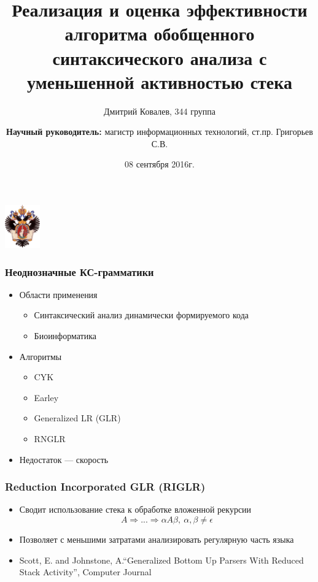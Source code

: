 \documentclass{beamer}
\title[]{Реализация и оценка эффективности алгоритма
	обобщенного синтаксического анализа с уменьшенной
	активностью стека}
\subtitle[]{}
\institute[СПбГУ]{
Санкт-Петербургский государственный университет \\
Кафедра системного программирования }
\author[Дмитрий Ковалев]{Дмитрий Ковалев, 344 группа \\
  \and  
    {\bfseries Научный руководитель:} магистр информационных технологий, ст.пр. Григорьев С.В. \\ 
}
\date{08 сентября 2016г.}
\begin{document}
{
\begin{frame}
  \begin{center}
  {\includegraphics[width=1.5cm]{pictures/SPbGU_Logo.png}}
  \end{center}
  \titlepage
\end{frame}
}

\begin{frame}[fragile]
  \transwipe[direction=90]
  \frametitle{Неоднозначные КС-грамматики}
  \begin{itemize}
    \item Области применения
	\begin{itemize}
		\item Синтаксический анализ динамически формируемого кода
		\item Биоинформатика
	\end{itemize}
	\item Алгоритмы
	\begin{itemize}
		\item CYK
		\item Earley
		\item Generalized LR (GLR)
		\item RNGLR
	\end{itemize}
    \item Недостаток --- скорость
  \end{itemize}
\end{frame}
            
\begin{frame}
  \transwipe[direction=90]
  \frametitle{Reduction Incorporated GLR (RIGLR)}
  \begin{itemize}
    \item Сводит использование стека к обработке вложенной рекурсии
    $$ A \Rightarrow ... \Rightarrow \alpha A \beta, \ \alpha, \beta \neq \epsilon $$
    \item Позволяет с меньшими затратами анализировать регулярную
    часть языка
    \item Scott, E. and Johnstone, A.``Generalized Bottom Up Parsers With Reduced Stack Activity'', Computer Journal
  \end{itemize}
\end{frame}
\end{document}
